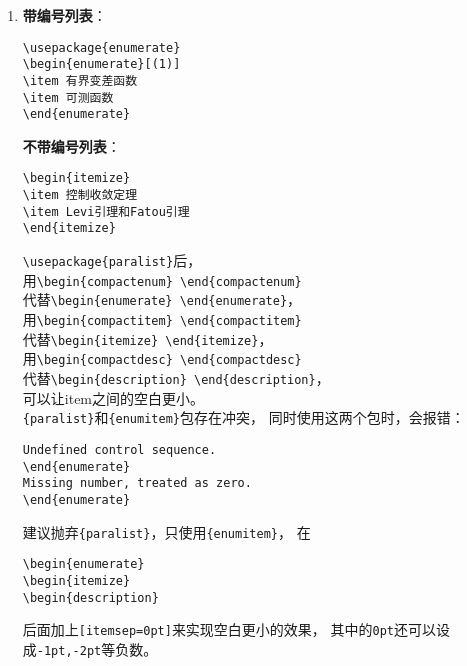 \documentclass[fontset=windows]{article}
\begin{document}
\begin{multicols}{2}
\begin{enumerate}
\item \textbf{带编号列表}：
\begin{lstlisting}
\usepackage{enumerate}
\begin{enumerate}[(1)]
\item 有界变差函数
\item 可测函数
\end{enumerate}
\end{lstlisting} 
\textbf{不带编号列表}：
\begin{lstlisting}
\begin{itemize}
\item 控制收敛定理
\item Levi引理和Fatou引理
\end{itemize}
\end{lstlisting} 
\verb|\usepackage{paralist}|后，\\
用\verb|\begin{compactenum} \end{compactenum}|\\
代替\verb|\begin{enumerate} \end{enumerate}|，\\
用\verb|\begin{compactitem} \end{compactitem}|\\
代替\verb|\begin{itemize} \end{itemize}|，\\
用\verb|\begin{compactdesc} \end{compactdesc}|\\
代替\verb|\begin{description} \end{description}|，\\
可以让item之间的空白更小。\\
\verb|{paralist}|和\verb|{enumitem}|包存在冲突，
同时使用这两个包时，会报错：
\begin{lstlisting}
Undefined control sequence. 
\end{enumerate}
Missing number, treated as zero. 
\end{enumerate}   
\end{lstlisting} 
建议抛弃\verb|{paralist}|，只使用\verb|{enumitem}|，
在
\begin{lstlisting}
\begin{enumerate}
\begin{itemize}
\begin{description}     
\end{lstlisting} 
后面加上\verb|[itemsep=0pt]|来实现空白更小的效果，
其中的\verb|0pt|还可以设成\verb|-1pt,-2pt|等负数。


\end{enumerate}
\end{multicols}
\end{document}
